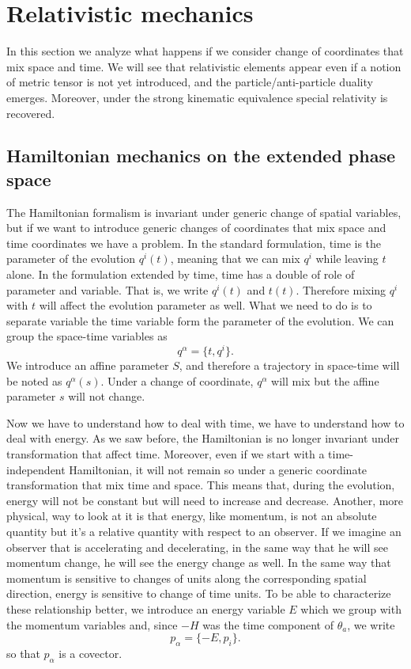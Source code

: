 \section{Relativistic mechanics}

In this section we analyze what happens if we consider change of coordinates that mix space and time. We will see that relativistic elements appear even if a notion of metric tensor is not yet introduced, and the particle/anti-particle duality emerges. Moreover, under the strong kinematic equivalence special relativity is recovered.

\subsection{Hamiltonian mechanics on the extended phase space}

The Hamiltonian formalism is invariant under generic change of spatial variables, but if we want to introduce generic changes of coordinates that mix space and time coordinates we have a problem. In the standard formulation, time is the parameter of the evolution $q^i(t)$, meaning that we can mix $q^i$ while leaving $t$ alone. In the formulation extended by time, time has a double of role of parameter and variable. That is, we write $q^i(t)$ and $t(t)$. Therefore mixing $q^i$ with $t$ will affect the evolution parameter as well. What we need to do is to separate variable the time variable form the parameter of the evolution. We can group the space-time variables as
\begin{equation}
	q^\alpha = \{t, q^i\}.
\end{equation}
We introduce an affine parameter $S$, and therefore a trajectory in space-time will be noted as $q^\alpha(s)$. Under a change of coordinate, $q^\alpha$ will mix but the affine parameter $s$ will not change.

Now we have to understand how to deal with time, we have to understand how to deal with energy. As we saw before, the Hamiltonian is no longer invariant under transformation that affect time. Moreover, even if we start with a time-independent Hamiltonian, it will not remain so under a generic coordinate transformation that mix time and space. This means that, during the evolution, energy will not be constant but will need to increase and decrease. Another, more physical, way to look at it is that energy, like momentum, is not an absolute quantity but it's a relative quantity with respect to an observer. If we imagine an observer that is accelerating and decelerating, in the same way that he will see momentum change, he will see the energy change as well. In the same way that momentum is sensitive to changes of units along the corresponding spatial direction, energy is sensitive to change of time units. To be able to characterize these relationship better, we introduce an energy variable $E$ which we group with the momentum variables and, since $-H$ was the time component of $\theta_a$, we write
\begin{equation}
	p_\alpha = \{-E, p_i\}.
\end{equation}
so that $p_\alpha$ is a covector.

